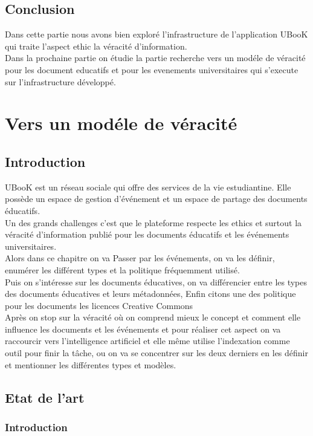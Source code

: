 \documentclass[12pt]{report}
\begin{document}
\newpage

\chapter*{Conclusion}
Dans cette partie nous avons bien exploré l'infrastructure de l'application UBooK qui traite l'aspect ethic la véracité d'information.\\
Dans la prochaine partie on étudie la partie recherche vers un modéle de véracité pour les document educatifs et pour les evenements universitaires qui s'execute sur l'infrastructure développé.

\part*{Vers un modéle de véracité}
\chapter*{Introduction}
UBooK est un réseau sociale qui offre des services 
de la vie estudiantine. Elle possède un espace de gestion 
d'événement et un espace de partage des documents éducatifs. 
\\Un des grands challenges c'est que le plateforme respecte 
les ethics et surtout la véracité d'information publié pour 
les documents éducatifs et les événements universitaires.
\\Alors dans ce chapitre on va Passer
 par les événements, on va les définir, 
enumérer les différent types et la politique 
fréquemment utilisé. 
\\Puis on s'intéresse sur les documents éducatives, on va différencier entre les types des documents éducatives et leurs métadonnées, Enfin citons une des politique pour les documents les licences Creative Commons 
\\Après on stop sur la véracité où on comprend mieux le
 concept et comment elle influence les documents et les 
événements et pour réaliser cet aspect on va raccourcir vers 
l'intelligence artificiel et elle même utilise l'indexation 
comme outil pour finir la tâche, ou on va se concentrer sur 
les deux derniers en les définir et mentionner les différentes
 types et modèles.

\newpage
\chapter{Etat de l'art}
\section*{Introduction}
\end{document}
